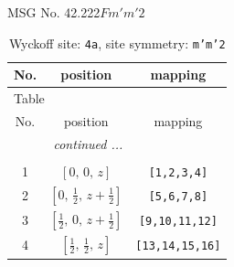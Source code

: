 \documentclass[fleqn,8pt]{jsarticle}
\begin{document}
\setcounter{MaxMatrixCols}{32}

\renewcommand{\tablename}{Table~}
\renewcommand{\figurename}{Figure~}
\begin{center}
\LARGE
MSG No. 42.222\quad$Fm'm'2$
\end{center}
\renewcommand{\arraystretch}{1.2}
\begin{longtable}{ccc}
\caption{Wyckoff site: {\tt 4a}, site symmetry: {\tt m'm'2}}
 \\
 \hline \hline
No. & position & mapping \\ \hline \endfirsthead

\multicolumn{2}{l}{\tablename\ \thetable{}} \\
 \hline \hline
No. & position & mapping \\ \hline \endhead

 \hline \hline
\multicolumn{2}{r}{\footnotesize\it continued ...} \\ \endfoot

 \hline \hline
\multicolumn{2}{r}{} \\ \endlastfoot

1 & $\left[ 0,\, 0,\, z \right]$ & {\tt [1,2,3,4]} \\ \hline
2 & $\left[ 0,\, \frac{1}{2},\, z + \frac{1}{2} \right]$ & {\tt [5,6,7,8]} \\ \hline
3 & $\left[ \frac{1}{2},\, 0,\, z + \frac{1}{2} \right]$ & {\tt [9,10,11,12]} \\ \hline
4 & $\left[ \frac{1}{2},\, \frac{1}{2},\, z \right]$ & {\tt [13,14,15,16]} \\
\end{longtable}
\renewcommand{\arraystretch}{1.2}
\end{document}
